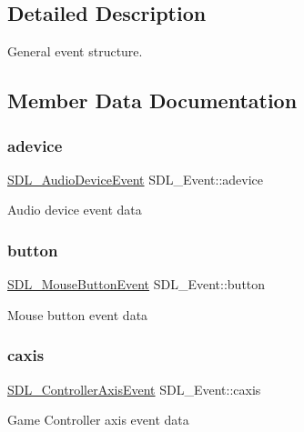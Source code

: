 \subsection{Detailed Description}
General event structure. 

\subsection{Member Data Documentation}
\mbox{\label{unionSDL__Event_a111e01fcac4fd8e251a6058ff9f17e72}} 
\subsubsection{\texorpdfstring{adevice}{adevice}}
{\footnotesize\ttfamily \hyperlink{structSDL__AudioDeviceEvent}{S\+D\+L\+\_\+\+Audio\+Device\+Event} S\+D\+L\+\_\+\+Event\+::adevice}

Audio device event data \mbox{\label{unionSDL__Event_ab6da2fa2687e5f849f270adecc64785f}} 
\subsubsection{\texorpdfstring{button}{button}}
{\footnotesize\ttfamily \hyperlink{structSDL__MouseButtonEvent}{S\+D\+L\+\_\+\+Mouse\+Button\+Event} S\+D\+L\+\_\+\+Event\+::button}

Mouse button event data \mbox{\label{unionSDL__Event_aa8f6df0f2716fae56204b12ab4a4c289}} 
\subsubsection{\texorpdfstring{caxis}{caxis}}
{\footnotesize\ttfamily \hyperlink{structSDL__ControllerAxisEvent}{S\+D\+L\+\_\+\+Controller\+Axis\+Event} S\+D\+L\+\_\+\+Event\+::caxis}

Game Controller axis event data \mbox{\label{unionSDL__Event_aee2b5671c8dcdb447023715cc21593cb}} 
